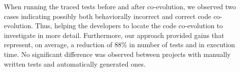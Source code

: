 	When running the traced tests before and after co-evolution, we observed two cases indicating possibly both behaviorally incorrect and correct code co-evolution. Thus, helping the developers to locate the code co-evolution to investigate in more detail. Furthermore, our approach provided gains that represent, on average, a reduction of 88\% in number of tests and  in execution time. No significant difference was observed between projects with manually written tests and automatically generated ones.   







